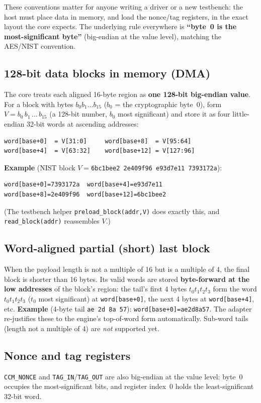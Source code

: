\documentclass[11pt,a4paper]{article}
\newcommand{\reg}[1]{\texttt{#1}}
\begin{document}
These conventions matter for anyone writing a driver or a new testbench: the host must place
data in memory, and load the nonce/tag registers, in the exact layout the core expects. The
underlying rule everywhere is \textbf{``byte~0 is the most-significant byte''} (big-endian at
the value level), matching the AES/NIST convention.

\subsection{128-bit data blocks in memory (DMA)}
The core treats each aligned 16-byte region as \textbf{one 128-bit big-endian value}. For a
block with bytes \(b_0 b_1 \dots b_{15}\) (\(b_0\) = the cryptographic byte~0), form
\(V = b_0\,b_1\,\dots\,b_{15}\) (a 128-bit number, \(b_0\) most significant) and store it as
four little-endian 32-bit words at ascending addresses:
\begin{lstlisting}
word[base+0]  = V[31:0]     word[base+8]  = V[95:64]
word[base+4]  = V[63:32]    word[base+12] = V[127:96]
\end{lstlisting}
\textbf{Example} (NIST block \(V=\)\texttt{6bc1bee2\,2e409f96\,e93d7e11\,7393172a}):
\begin{lstlisting}
word[base+0]=7393172a  word[base+4]=e93d7e11
word[base+8]=2e409f96  word[base+12]=6bc1bee2
\end{lstlisting}
(The testbench helper \texttt{preload\_block(addr,V)} does exactly this, and
\texttt{read\_block(addr)} reassembles \(V\).)

\subsection{Word-aligned partial (short) last block}
When the payload length is not a multiple of 16 but is a multiple of 4, the final block is
shorter than 16 bytes. Its valid words are stored \textbf{byte-forward at the low addresses}
of the block's region: the tail's first 4 bytes \(t_0 t_1 t_2 t_3\) form the word
\(t_0 t_1 t_2 t_3\) (\(t_0\) most significant) at \texttt{word[base+0]}, the next 4 bytes at
\texttt{word[base+4]}, etc. \textbf{Example} (4-byte tail \texttt{ae 2d 8a 57}):
\texttt{word[base+0]=ae2d8a57}. The adapter re-justifies these to the engine's top-of-word
form automatically. Sub-word tails (length not a multiple of 4) are \emph{not} supported yet.

\subsection{Nonce and tag registers}
\reg{CCM\_NONCE} and \reg{TAG\_IN}/\reg{TAG\_OUT} are also big-endian at the value level:
byte~0 occupies the most-significant bits, and register index~0 holds the least-significant
32-bit word.
\end{document}

